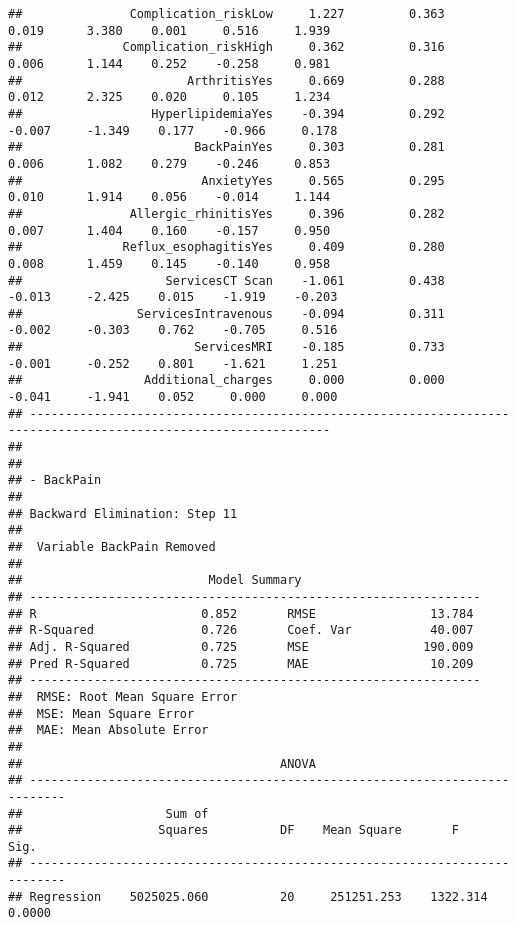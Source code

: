 \documentclass[
]{article}
\begin{document}
\begin{verbatim}
##               Complication_riskLow     1.227         0.363        0.019      3.380    0.001     0.516     1.939 
##              Complication_riskHigh     0.362         0.316        0.006      1.144    0.252    -0.258     0.981 
##                       ArthritisYes     0.669         0.288        0.012      2.325    0.020     0.105     1.234 
##                  HyperlipidemiaYes    -0.394         0.292       -0.007     -1.349    0.177    -0.966     0.178 
##                        BackPainYes     0.303         0.281        0.006      1.082    0.279    -0.246     0.853 
##                         AnxietyYes     0.565         0.295        0.010      1.914    0.056    -0.014     1.144 
##               Allergic_rhinitisYes     0.396         0.282        0.007      1.404    0.160    -0.157     0.950 
##              Reflux_esophagitisYes     0.409         0.280        0.008      1.459    0.145    -0.140     0.958 
##                    ServicesCT Scan    -1.061         0.438       -0.013     -2.425    0.015    -1.919    -0.203 
##                ServicesIntravenous    -0.094         0.311       -0.002     -0.303    0.762    -0.705     0.516 
##                        ServicesMRI    -0.185         0.733       -0.001     -0.252    0.801    -1.621     1.251 
##                 Additional_charges     0.000         0.000       -0.041     -1.941    0.052     0.000     0.000 
## ----------------------------------------------------------------------------------------------------------------
## 
## 
## - BackPain 
## 
## Backward Elimination: Step 11 
## 
##  Variable BackPain Removed 
## 
##                          Model Summary                          
## ---------------------------------------------------------------
## R                       0.852       RMSE                13.784 
## R-Squared               0.726       Coef. Var           40.007 
## Adj. R-Squared          0.725       MSE                190.009 
## Pred R-Squared          0.725       MAE                 10.209 
## ---------------------------------------------------------------
##  RMSE: Root Mean Square Error 
##  MSE: Mean Square Error 
##  MAE: Mean Absolute Error 
## 
##                                    ANOVA                                    
## ---------------------------------------------------------------------------
##                    Sum of                                                  
##                   Squares          DF    Mean Square       F          Sig. 
## ---------------------------------------------------------------------------
## Regression    5025025.060          20     251251.253    1322.314    0.0000 

\end{verbatim}
\end{document}
